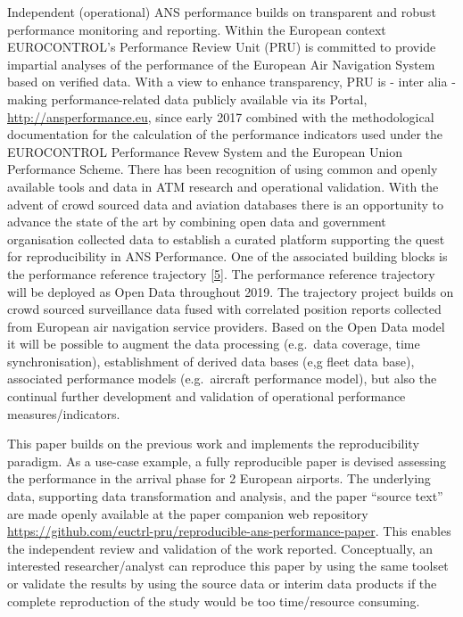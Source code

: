 \documentclass[conference,final,a4paper,]{IEEEtran}
\begin{document}
Independent (operational) ANS performance builds on transparent and
robust performance monitoring and reporting. Within the European context
EUROCONTROL's Performance Review Unit (PRU) is committed to provide
impartial analyses of the performance of the European Air Navigation
System based on verified data. With a view to enhance transparency, PRU
is - inter alia - making performance-related data publicly available via
its Portal, \url{http://ansperformance.eu}, since early 2017 combined
with the methodological documentation for the calculation of the
performance indicators used under the EUROCONTROL Performance Revew
System and the European Union Performance Scheme. There has been
recognition of using common and openly available tools and data in ATM
research and operational validation. With the advent of crowd sourced
data and aviation databases there is an opportunity to advance the state
of the art by combining open data and government organisation collected
data to establish a curated platform supporting the quest for
reproducibility in ANS Performance. One of the associated building
blocks is the performance reference trajectory
{[}\protect\hyperlink{ref-spinielli_2018}{5}{]}. The performance
reference trajectory will be deployed as Open Data throughout 2019. The
trajectory project builds on crowd sourced surveillance data fused with
correlated position reports collected from European air navigation
service providers. Based on the Open Data model it will be possible to
augment the data processing (e.g.~data coverage, time synchronisation),
establishment of derived data bases (e,g fleet data base), associated
performance models (e.g.~aircraft performance model), but also the
continual further development and validation of operational performance
measures/indicators.

This paper builds on the previous work and implements the
reproducibility paradigm. As a use-case example, a fully reproducible
paper is devised assessing the performance in the arrival phase for 2
European airports. The underlying data, supporting data transformation
and analysis, and the paper ``source text'' are made openly available at
the paper companion web repository
\url{https://github.com/euctrl-pru/reproducible-ans-performance-paper}.
This enables the independent review and validation of the work reported.
Conceptually, an interested researcher/analyst can reproduce this paper
by using the same toolset or validate the results by using the source
data or interim data products if the complete reproduction of the study
would be too time/resource consuming.
\end{document}
